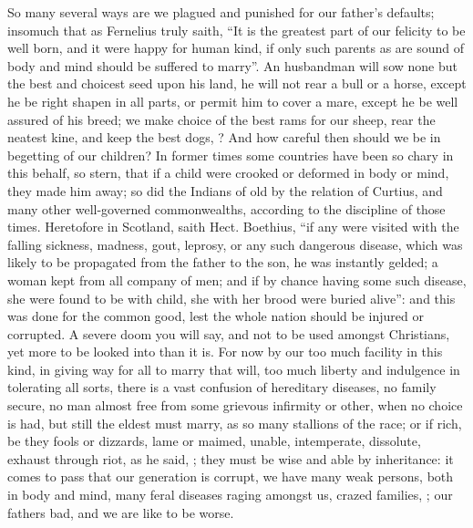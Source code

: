 So many several ways are we plagued and punished for our father's defaults;
insomuch that as Fernelius truly saith, \enquote{It is the
greatest part of our felicity to be well born, and it were happy for human
kind, if only such parents as are sound of body and mind should be suffered to
marry}. An husbandman will sow none but the best and choicest seed upon his
land, he will not rear a bull or a horse, except he be right shapen in all
parts, or permit him to cover a mare, except he be well assured of his breed;
we make choice of the best rams for our sheep, rear the neatest kine, and keep
the best dogs, ?
And how careful then should we be in begetting of our children? In former times
some countries have been so chary in this behalf, so
stern, that if a child were crooked or deformed in body or mind, they made him
away; so did the Indians of old by the relation of Curtius, and many other
well-governed commonwealths, according to the discipline of those times.
Heretofore in Scotland, saith Hect. Boethius, \enquote{if any were
visited with the falling sickness, madness, gout, leprosy, or any such
dangerous disease, which was likely to be propagated from the father to the
son, he was instantly gelded; a woman kept from all company of men; and if by
chance having some such disease, she were found to be with child, she with her
brood were buried alive}: and this was done for the common good, lest the whole
nation should be injured or corrupted. A severe doom you will say, and not to
be used amongst Christians, yet more to be looked into than it is. For now by
our too much facility in this kind, in giving way for all to marry that will,
too much liberty and indulgence in tolerating all sorts, there is a vast
confusion of hereditary diseases, no family secure, no man almost free from
some grievous infirmity or other, when no choice is had, but still the eldest
must marry, as so many stallions of the race; or if rich, be they fools or
dizzards, lame or maimed, unable, intemperate, dissolute, exhaust through riot,
as he said, ; they
must be wise and able by inheritance: it comes to pass that our generation is
corrupt, we have many weak persons, both in body and mind, many feral diseases
raging amongst us, crazed families, ; our fathers
bad, and we are like to be worse.

